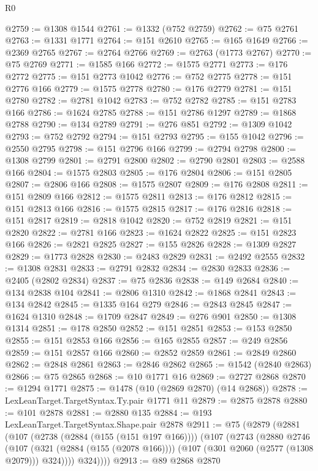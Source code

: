 \begin{lexlean}{R0}
\begin{coremodule}
@2759 := @1308 @1544
@2761 := @1332 (@752 @2759)
@2762 := @75 @2761
@2763 := @1331 @1771
@2764 := @151 @2610
@2765 := @165 @1649
@2766 := @2369 @2765
@2767 := @2764 @2766
@2769 := @2763 (@1773 @2767)
@2770 := @75 @2769
@2771 := @1585 @166
@2772 := @1575 @2771
@2773 := @176 @2772
@2775 := @151 @2773 @1042
@2776 := @752 @2775
@2778 := @151 @2776 @166
@2779 := @1575 @2778
@2780 := @176 @2779
@2781 := @151 @2780
@2782 := @2781 @1042
@2783 := @752 @2782
@2785 := @151 @2783 @166
@2786 := @1624 @2785
@2788 := @151 @2786 @1297
@2789 := @1868 @2788
@2790 := @134 @2789
@2791 := @276 @851
@2792 := @1309 @1042
@2793 := @752 @2792
@2794 := @151 @2793
@2795 := @155 @1042
@2796 := @2550 @2795
@2798 := @151 @2796 @166
@2799 := @2794 @2798
@2800 := @1308 @2799
@2801 := @2791 @2800
@2802 := @2790 @2801
@2803 := @2588 @166
@2804 := @1575 @2803
@2805 := @176 @2804
@2806 := @151 @2805
@2807 := @2806 @166
@2808 := @1575 @2807
@2809 := @176 @2808
@2811 := @151 @2809 @166
@2812 := @1575 @2811
@2813 := @176 @2812
@2815 := @151 @2813 @166
@2816 := @1575 @2815
@2817 := @176 @2816
@2818 := @151 @2817
@2819 := @2818 @1042
@2820 := @752 @2819
@2821 := @151 @2820
@2822 := @2781 @166
@2823 := @1624 @2822
@2825 := @151 @2823 @166
@2826 := @2821 @2825
@2827 := @155 @2826
@2828 := @1309 @2827
@2829 := @1773 @2828
@2830 := @2483 @2829
@2831 := @2492 @2555
@2832 := @1308 @2831
@2833 := @2791 @2832
@2834 := @2830 @2833
@2836 := @2405 (@2802 @2834)
@2837 := @75 @2836
@2838 := @149 @2684
@2840 := @134 @2838 @104
@2841 := @2806 @1310
@2842 := @1868 @2841
@2843 := @134 @2842
@2845 := @1335 @164 @279
@2846 := @2843 @2845
@2847 := @1624 @1310
@2848 := @1709 @2847
@2849 := @276 @901
@2850 := @1308 @1314
@2851 := @178 @2850
@2852 := @151 @2851
@2853 := @153 @2850
@2855 := @151 @2853 @166
@2856 := @165 @2855
@2857 := @249 @2856
@2859 := @151 @2857 @166
@2860 := @2852 @2859
@2861 := @2849 @2860
@2862 := @2848 @2861
@2863 := @2846 @2862
@2865 := @1542 (@2840 @2863)
@2866 := @75 @2865
@2868 := @10 @1771 @16
@2869 := @2727 @2868
@2870 := @1294 @1771
@2875 := @1478 (@10 (@2869 @2870) (@14 @2868))
@2878 := LexLeanTarget.TargetSyntax.Ty.pair @1771 @11
@2879 := @2875 @2878
@2880 := @101 @2878
@2881 := @2880 @135
@2884 := @193 LexLeanTarget.TargetSyntax.Shape.pair @2878
@2911 := @75
    (@2879
      (@2881
        (@107
          (@2738 (@2884 (@155 (@151 @197 @166))))
          (@107
            (@2743
              (@2880
                @2746
                (@107
                  (@321 (@2884 (@155 (@2078 @166))))
                  (@107 (@301 @2060 (@2577 (@1308 @2079))) @324))))
            @324))))
@2913 := @89 @2868 @2870

\end{coremodule}
\end{lexlean}
